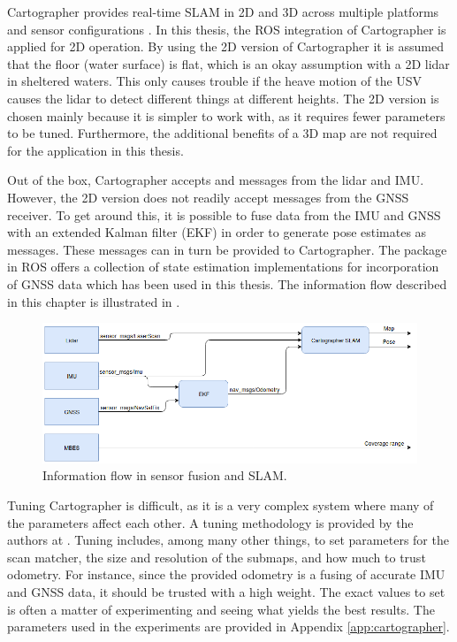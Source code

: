 Cartographer provides real-time SLAM in 2D and 3D across multiple platforms and sensor configurations \citep{website:Cartographer}. In this thesis, the ROS integration of Cartographer \citep{website:CartographerRos} is applied for 2D operation. By using the 2D version of Cartographer it is assumed that the floor (water surface) is flat, which is an okay assumption with a 2D lidar in sheltered waters. This only causes trouble if the heave motion of the USV causes the lidar to detect different things at different heights. The 2D version is chosen mainly because it is simpler to work with, as it requires fewer parameters to be tuned. Furthermore, the additional benefits of a 3D map are not required for the application in this thesis.

Out of the box, Cartographer accepts  and  messages from the lidar and IMU. However, the 2D version does not readily accept  messages from the GNSS receiver. To get around this, it is possible to fuse data from the IMU and GNSS with an extended Kalman filter (EKF) in order to generate pose estimates as  messages. These messages can in turn be provided to Cartographer. The  package in ROS \citep{ros:robotlocalization} offers a collection of state estimation implementations for incorporation of GNSS data which has been used in this thesis. The information flow described in this chapter is illustrated in .

\begin{figure}[h!]
	\centering
	\includegraphics[width=1.0\linewidth]{fig/instrumentation/sensor_fusion}
	\caption{Information flow in sensor fusion and SLAM.}
	\label{fig:sensor_fusion}
\end{figure} 

Tuning Cartographer is difficult, as it is a very complex system where many of the parameters affect each other. A tuning methodology is provided by the authors at \citet{website:CartographerRos}. Tuning includes, among many other things, to set parameters for the scan matcher, the size and resolution of the submaps, and how much to trust odometry. For instance, since the provided odometry is a fusing of accurate IMU and GNSS data, it should be trusted with a high weight. The exact values to set is often a matter of experimenting and seeing what yields the best results. The parameters used in the experiments are provided in Appendix \ref{app:cartographer}.


